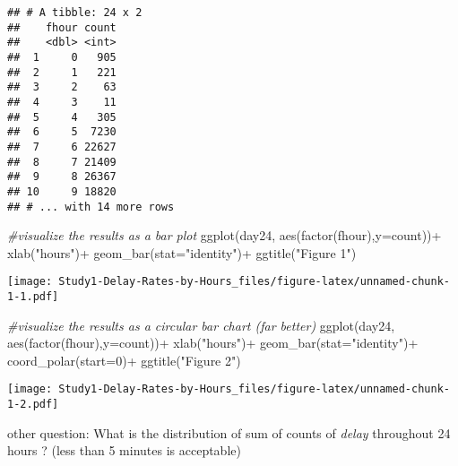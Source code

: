 \documentclass[
]{article}
\newenvironment{Shaded}{\begin{snugshade}}{\end{snugshade}}
\newcommand{\AttributeTok}[1]{\textcolor[rgb]{0.77,0.63,0.00}{#1}}
\newcommand{\CommentTok}[1]{\textcolor[rgb]{0.56,0.35,0.01}{\textit{#1}}}
\newcommand{\DecValTok}[1]{\textcolor[rgb]{0.00,0.00,0.81}{#1}}
\newcommand{\FunctionTok}[1]{\textcolor[rgb]{0.00,0.00,0.00}{#1}}
\newcommand{\NormalTok}[1]{#1}
\newcommand{\SpecialCharTok}[1]{\textcolor[rgb]{0.00,0.00,0.00}{#1}}
\newcommand{\StringTok}[1]{\textcolor[rgb]{0.31,0.60,0.02}{#1}}
\begin{document}
\begin{verbatim}
## # A tibble: 24 x 2
##    fhour count
##    <dbl> <int>
##  1     0   905
##  2     1   221
##  3     2    63
##  4     3    11
##  5     4   305
##  6     5  7230
##  7     6 22627
##  8     7 21409
##  9     8 26367
## 10     9 18820
## # ... with 14 more rows
\end{verbatim}

\begin{Shaded}
\begin{Highlighting}[]
\CommentTok{\#visualize the results as a bar plot}
\FunctionTok{ggplot}\NormalTok{(day24, }\FunctionTok{aes}\NormalTok{(}\FunctionTok{factor}\NormalTok{(fhour),}\AttributeTok{y=}\NormalTok{count))}\SpecialCharTok{+}
  \FunctionTok{xlab}\NormalTok{(}\StringTok{"hours"}\NormalTok{)}\SpecialCharTok{+}
  \FunctionTok{geom\_bar}\NormalTok{(}\AttributeTok{stat=}\StringTok{"identity"}\NormalTok{)}\SpecialCharTok{+}
  \FunctionTok{ggtitle}\NormalTok{(}\StringTok{"Figure 1"}\NormalTok{)}
\end{Highlighting}
\end{Shaded}

\texttt{[image: Study1-Delay-Rates-by-Hours\_files/figure-latex/unnamed-chunk-1-1.pdf]}

\begin{Shaded}
\begin{Highlighting}[]
\CommentTok{\#visualize the results as a circular bar chart (far better)}
\FunctionTok{ggplot}\NormalTok{(day24, }\FunctionTok{aes}\NormalTok{(}\FunctionTok{factor}\NormalTok{(fhour),}\AttributeTok{y=}\NormalTok{count))}\SpecialCharTok{+}
  \FunctionTok{xlab}\NormalTok{(}\StringTok{"hours"}\NormalTok{)}\SpecialCharTok{+}
  \FunctionTok{geom\_bar}\NormalTok{(}\AttributeTok{stat=}\StringTok{"identity"}\NormalTok{)}\SpecialCharTok{+}
  \FunctionTok{coord\_polar}\NormalTok{(}\AttributeTok{start=}\DecValTok{0}\NormalTok{)}\SpecialCharTok{+}
  \FunctionTok{ggtitle}\NormalTok{(}\StringTok{"Figure 2"}\NormalTok{)}
\end{Highlighting}
\end{Shaded}

\texttt{[image: Study1-Delay-Rates-by-Hours\_files/figure-latex/unnamed-chunk-1-2.pdf]}

other question: What is the distribution of sum of counts of
\emph{delay} throughout 24 hours ? (less than 5 minutes is acceptable)
\end{document}

